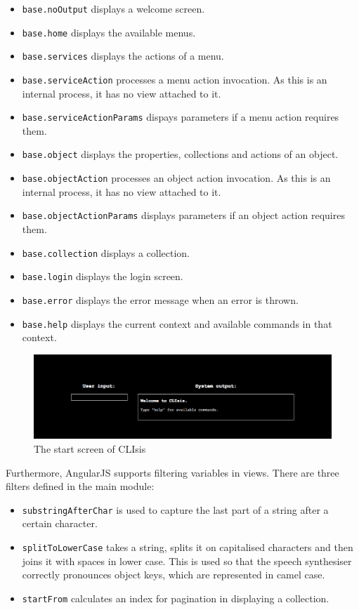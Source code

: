 \begin{itemize}
	\item \texttt{base.noOutput} displays a welcome screen.
	\item \texttt{base.home} displays the available menus.
	\item \texttt{base.services} displays the actions of a menu.
	\item \texttt{base.serviceAction} processes a menu action invocation. As this is an internal process, it has no view attached to it.
	\item \texttt{base.serviceActionParams} dispays parameters if a menu action requires them.
	\item \texttt{base.object} displays the properties, collections and actions of an object.
	\item \texttt{base.objectAction} processes an object action invocation. As this is an internal process, it has no view attached to it.
	\item \texttt{base.objectActionParams} displays parameters if an object action requires them.
	\item \texttt{base.collection} displays a collection.
	\item \texttt{base.login} displays the login screen.
	\item \texttt{base.error} displays the error message when an error is thrown.
	\item \texttt{base.help} displays the current context and available commands in that context.
\end{itemize}

\begin{figure}[h]
	\center
	\includegraphics[width=\textwidth]{figures/clisisviews}
	\caption{The start screen of CLIsis}
	\label{figure:clisisviews}
\end{figure}

Furthermore, AngularJS supports filtering variables in views. There are three filters defined in the main module: 
\begin{itemize}
	\item \texttt{substringAfterChar} is used to capture the last part of a string after a certain character.
	\item \texttt{splitToLowerCase} takes a string, splits it on capitalised characters and then joins it with spaces in lower case. This is used so that the speech synthesiser correctly pronounces object keys, which are represented in camel case.
	\item \texttt{startFrom} calculates an index for pagination in displaying a collection.
\end{itemize} 

